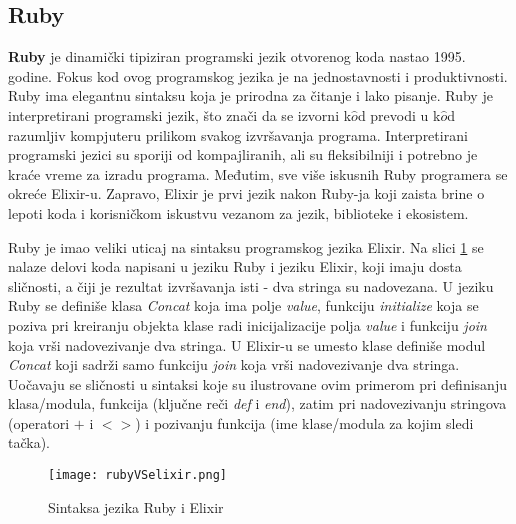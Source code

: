 \documentclass[12pt,oneside]{memoir}
\begin{document}
\subsection{Ruby}
\textbf{Ruby} je dinamički tipiziran programski jezik otvorenog koda nastao 1995. godine. Fokus kod ovog programskog jezika je na jednostavnosti i produktivnosti. Ruby ima elegantnu sintaksu koja je prirodna za čitanje i lako pisanje.
Ruby je interpretirani programski jezik, što znači da se izvorni k$\hat{o}$d prevodi u k$\hat{o}$d razumljiv kompjuteru prilikom svakog izvršavanja programa. Interpretirani programski jezici su sporiji od kompajliranih, ali su fleksibilniji i potrebno je kraće vreme za izradu programa.
Međutim, sve više iskusnih Ruby programera se okreće Elixir-u. Zapravo, Elixir je prvi jezik nakon Ruby-ja koji zaista brine o lepoti koda i korisničkom iskustvu vezanom za jezik, biblioteke i ekosistem. 

Ruby je imao veliki uticaj na sintaksu programskog jezika Elixir. Na slici \ref{fig:RubyElixirCode} se nalaze delovi koda napisani u jeziku Ruby i jeziku Elixir, koji imaju dosta sličnosti, a čiji je rezultat izvršavanja isti - dva stringa su nadovezana. U jeziku Ruby se definiše klasa \textit{Concat} koja ima polje \textit{value}, funkciju \textit{initialize} koja se poziva pri kreiranju objekta klase radi inicijalizacije polja \textit{value} i funkciju \textit{join} koja vrši nadovezivanje dva stringa. U Elixir-u se umesto klase definiše modul \textit{Concat} koji sadrži samo funkciju \textit{join} koja vrši nadovezivanje dva stringa. Uočavaju se sličnosti u sintaksi koje su ilustrovane ovim primerom pri definisanju klasa/modula, funkcija (ključne reči \textit{def} i \textit{end}), zatim pri nadovezivanju stringova (operatori $+$ i $<>$) i pozivanju funkcija (ime klase/modula za kojim sledi tačka).

\begin{figure}[!ht]
  \centering
  \texttt{[image: rubyVSelixir.png]}
  \caption{Sintaksa jezika Ruby i Elixir}
  \label{fig:RubyElixirCode}
\end{figure}
\end{document}
